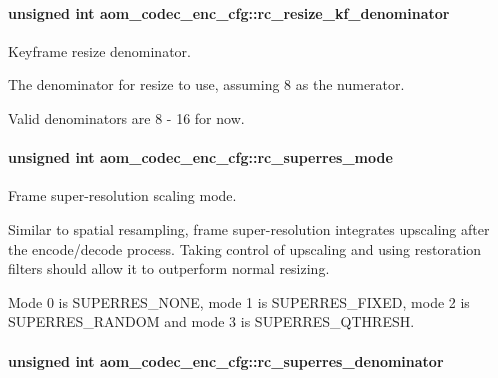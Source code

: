 \paragraph[{\texorpdfstring{rc\+\_\+resize\+\_\+kf\+\_\+denominator}{rc_resize_kf_denominator}}]{\setlength{\rightskip}{0pt plus 5cm}unsigned int aom\+\_\+codec\+\_\+enc\+\_\+cfg\+::rc\+\_\+resize\+\_\+kf\+\_\+denominator}\hypertarget{structaom__codec__enc__cfg_a5da400d15cfd927a18e17a44985b910a}{}\label{structaom__codec__enc__cfg_a5da400d15cfd927a18e17a44985b910a}


Keyframe resize denominator. 

The denominator for resize to use, assuming 8 as the numerator.

Valid denominators are 8 -\/ 16 for now. 
\paragraph[{\texorpdfstring{rc\+\_\+superres\+\_\+mode}{rc_superres_mode}}]{\setlength{\rightskip}{0pt plus 5cm}unsigned int aom\+\_\+codec\+\_\+enc\+\_\+cfg\+::rc\+\_\+superres\+\_\+mode}\hypertarget{structaom__codec__enc__cfg_a704ff1b4202b1d5499928b98eef17424}{}\label{structaom__codec__enc__cfg_a704ff1b4202b1d5499928b98eef17424}


Frame super-\/resolution scaling mode. 

Similar to spatial resampling, frame super-\/resolution integrates upscaling after the encode/decode process. Taking control of upscaling and using restoration filters should allow it to outperform normal resizing.

Mode 0 is S\+U\+P\+E\+R\+R\+E\+S\+\_\+\+N\+O\+NE, mode 1 is S\+U\+P\+E\+R\+R\+E\+S\+\_\+\+F\+I\+X\+ED, mode 2 is S\+U\+P\+E\+R\+R\+E\+S\+\_\+\+R\+A\+N\+D\+OM and mode 3 is S\+U\+P\+E\+R\+R\+E\+S\+\_\+\+Q\+T\+H\+R\+E\+SH. 
\paragraph[{\texorpdfstring{rc\+\_\+superres\+\_\+denominator}{rc_superres_denominator}}]{\setlength{\rightskip}{0pt plus 5cm}unsigned int aom\+\_\+codec\+\_\+enc\+\_\+cfg\+::rc\+\_\+superres\+\_\+denominator}\hypertarget{structaom__codec__enc__cfg_a9217f81f33c62161df9d94e42f2b77c6}{}\label{structaom__codec__enc__cfg_a9217f81f33c62161df9d94e42f2b77c6}


